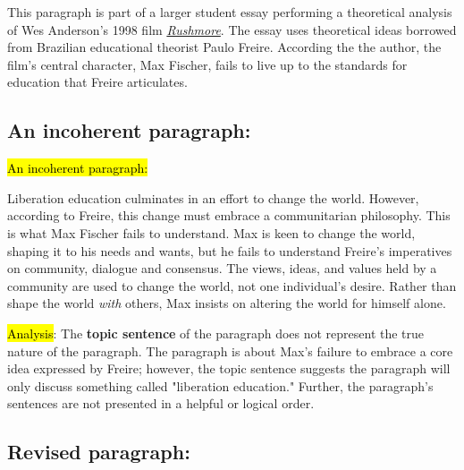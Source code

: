 This paragraph is part of a larger student essay performing a theoretical analysis of Wes Anderson's 1998 film \href{http://en.wikipedia.org/wiki/Rushmore_%28film%29}{\emph{Rushmore}}. The essay uses theoretical ideas borrowed from Brazilian educational theorist Paulo Freire. According the the author, the film's central character, Max Fischer, fails to live up to the standards for education that Freire articulates.

\subsection*{An incoherent paragraph:} 

\bigskip

\begin{tcolorbox}[enhanced,width=4.2in,left=.3in, right=.3in,
   drop fuzzy shadow southeast,
    boxrule=0.4pt,sharp corners,colframe=black!80!black,colback=white!10]

\medskip

{\small
\begin{doublespacing}

\hl{An incoherent paragraph:}\medskip

\hspace{.5cm}Liberation education culminates in an effort to change the world. However, according to Freire, this change must embrace a communitarian philosophy. This is what Max Fischer fails to understand. Max is keen to change the world, shaping it to his needs and wants, but he fails to understand Freire's imperatives on community, dialogue and consensus. The views, ideas, and values held by a community are used to change the world, not one individual's desire. Rather than shape the world \emph{with} others, Max insists on altering the world for himself alone.

\medskip

\end{doublespacing}}

\end{tcolorbox}

\hl{Analysis}: The \textbf{topic sentence} of the paragraph does not represent the true nature of the paragraph. The paragraph is about Max's failure to embrace a core idea expressed by Freire; however, the topic sentence suggests the paragraph will only discuss something called "liberation education." Further, the paragraph's sentences are not presented in a helpful or logical order.

\subsection*{Revised paragraph:}

